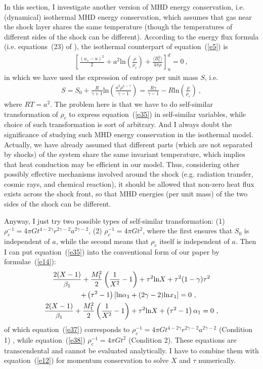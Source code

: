 \documentclass[fleqn,usenatbib]{mnras}
\begin{document}
In this section, I investigate another version of MHD energy conservation, i.e. (dynamical) isothermal MHD energy conservation, which assumes that gas near the shock layer shares the same temperature (though the temperatures of different sides of the shock can be different). According to the energy flux formula (i.e. equations~(23) of \citet{lou2004envelope}), the isothermal counterpart of equation~(\ref{e5}) is
\begin{gather}
\left[\frac{\left(u_{s}-u\right)^{2}}{2}+a^{2}\mathrm{ln}\left(\frac{\rho}{\rho_{c}}\right)+\frac{\langle B_{t}^{2}\rangle}{4\pi \rho}\right]_{u}^{d}=0\ ,\label{e35}
\end{gather} 
in which we have used the expression of entropy per unit mass $S$, i.e.
\begin{gather}
S=S_{0}+\frac{R}{\gamma+1}\mathrm{ln}\left(\frac{a^{2}\rho^{1-\gamma}}{\gamma-1}\right)=\frac{R\gamma}{\gamma-1}-R\mathrm{ln}\left(\frac{\rho}{\rho_{c}}\right)\ ,\label{e36}
\end{gather}
where $RT=a^{2}$. The problem here is that we have to do self-similar transformation of $\rho_{c}$ to express equation~(\ref{e35}) in self-similar variables, while choice of such transformation is sort of arbitrary. And I always doubt the significance of studying such MHD energy conservation in the isothermal model. Actually, we have already assumed that different parts (which are not separated by shocks) of the system share the same invariant temperature, which implies that heat conduction may be efficient in our model. Thus, considering other possibly effective mechanisms involved around the shock (e.g. radiation transfer, cosmic rays, and chemical reaction), it should be allowed that non-zero heat flux exists across the shock front, so that MHD energies (per unit mass) of the two sides of the shock can be different. 

Anyway, I just try two possible types of self-similar transformation: (1) $\rho_{c}^{-1}=4\pi Gt^{4-2\gamma}r^{2\gamma-2}a^{2\gamma-2}$, (2) $\rho_{c}^{-1}=4\pi Gt^{2}$, where the first ensures that $S_{0}$ is independent of $a$, while the second means that $\rho_{c}$ itself is independent of $a$. Then I can put equation~(\ref{e35}) into the conventional form of our paper by formulae~(\ref{e14}):
\begin{gather}
\frac{2(X-1)}{\beta_{1}}+\frac{M_{1}^{2}}{2}\left(\frac{1}{X^{2}}-1\right)+\tau^{2}\mathrm{ln}X+\tau^{2}(1-\gamma)\mathrm{\tau^{2}}\notag\\
\qquad +\left(\tau^{2}-1\right)\left[\mathrm{ln}\alpha_{1}+(2\gamma-2)\mathrm{ln}x_{1}\right]=0\ ,\label{e37}\\
\frac{2(X-1)}{\beta_{1}}+\frac{M_{1}^{2}}{2}\left(\frac{1}{X^{2}}-1\right)+\tau^{2}\mathrm{ln}X+\left(\tau^{2}-1\right)\mathrm{\alpha_{1}}=0\ ,\label{e38}
\end{gather}
of which equation~(\ref{e37}) corresponds to $\rho_{c}^{-1}=4\pi Gt^{4-2\gamma}r^{2\gamma-2}a^{2\gamma-2}$ (Condition 1) , while equation~(\ref{e38}) $\rho_{c}^{-1}=4\pi Gt^{2}$ (Condition 2). These equations are transcendental and cannot be evaluated analytically. I have to combine them with equation~(\ref{e12}) for momentum conservation to solve $X$ and $\tau$ numerically. 
\end{document}
